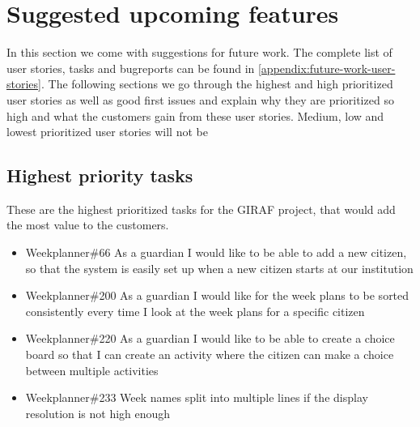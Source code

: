 \section{Suggested upcoming features}
In this section we come with suggestions for future work. 
The complete list of user stories, tasks and bugreports can be found in \autoref{appendix:future-work-user-stories}.
The following sections we go through the highest and high prioritized user stories as well as good first issues and explain why they are prioritized so high and what the customers gain from these user stories.
Medium, low and lowest prioritized user stories will not be 


\subsection{Highest priority tasks}\label{highest-priority-tasks}
These are the highest prioritized tasks for the GIRAF project, that would add the most value to the customers.

\begin{itemize}
    \item Weekplanner\#66 As a guardian I would like to be able to add a new citizen, so that the system is easily set up when a new citizen starts at our institution
    \item Weekplanner\#200 As a guardian I would like for the week plans to be sorted consistently every time I look at the week plans for a specific citizen
    \item Weekplanner\#220 As a guardian I would like to be able to create a choice board so that I can create an activity where the citizen can make a choice between multiple activities 
    \item Weekplanner\#233 Week names split into multiple lines if the display resolution is not high enough 
\end{itemize}

